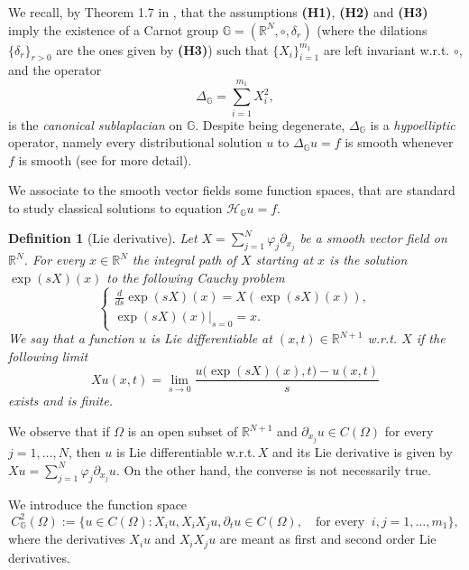 \documentclass[11pt,a4paper]{article}
\newtheorem{definition}[theorem]{\bf Definition}
\numberwithin{equation}{section}
\newcommand{\R}{\mathbb{R}}
\def \rn {{\mathbb {R}}^{N}}
\def \rnn {{\mathbb {R}}^{N+1}}
\def \GG {{\mathbb{G}}}
\def \p {\partial}
\def \H {\mathscr{H}_\GG}
\def \d {{\delta}}
\def \phi {{\varphi}}
\def \O {{\Omega}}
\begin{document}
{\medskip

We recall, by Theorem 1.7 in \cite{bonfiglioli2020hormander}, that the assumptions \textbf{(H1)}, \textbf{(H2)} and \textbf{(H3)} imply the existence of a Carnot group $\GG=\left(\rn,\circ,\d_{r}\right)$ (where the dilations $\{\d_r\}_{r>0}$ are the ones given by \textbf{(H3)}) such that $\{X_i\}^{m_1}_{i=1}$ are left invariant w.r.t. $\circ$, and the operator
\begin{equation}\label{sublaplacian}
	\Delta_{\GG}=\sum_{i=1}^{m_1}X_i^2,
\end{equation}
is the \emph{canonical sublaplacian} on $\GG$. Despite being degenerate, $\Delta_{\GG}$ is a \emph{hypoelliptic} operator, namely every distributional solution $u$ to $\Delta_\GG u=f$ is smooth whenever $f$ is smooth (see \cite{hormander1967hypoelliptic} for more detail).

\medskip

We associate to the smooth vector fields some function spaces, that are standard to study classical solutions to equation $\H u= f$.
\begin{definition}[Lie derivative]\label{Lie-derivative}
	Let $X=\sum_{j=1}^N \phi_j\p_{x_j}$ be a smooth vector field on $\rn$. For every $x\in \rn$ the \emph{integral path of} $X$ \emph{starting at} $x$ is the solution $\exp(sX)(x) $ to the following Cauchy problem
	\begin{equation}
		\begin{cases}
			\frac{d}{ds}\exp(sX)(x) = X \left( \exp(sX)(x)\right),\\
			\exp(sX)(x)|_{s=0}=x.
		\end{cases}
	\end{equation}
	We say that a function $u$ is Lie differentiable at $(x,t)\in\rnn$ w.r.t. $X$ if the following limit
	\begin{equation}
		Xu(x,t)=\lim_{s\rightarrow 0} \frac{u\big(\exp(sX)(x) ,t\big)-u(x,t)}{s}
	\end{equation}
	 exists and is finite.
\end{definition} 
We observe that if $\Omega$ is an open subset of $\R^{N+1}$ and $\p_{x_j}u \in C\left(\O\right)$ for every $j=1,\ldots,N$, then $u$ is Lie differentiable w.r.t.$\,X$ and its Lie derivative is given by $Xu=\sum_{j=1}^N \phi_j\p_{x_j}u$. On the other hand, the converse is not necessarily true. 


We introduce the function space
\begin{equation}\label{C2}
	C^2_\GG\left(\O\right):= \Big\{ u\in C(\O):X_i u, X_iX_j u,\p_tu \in C(\O),\quad  \text{for every}\;\; i,j=1,\ldots,m_1\Big\},
\end{equation}
where the derivatives $X_iu$ and $X_iX_ju$ are meant as first and second order Lie derivatives.


}
\end{document}
